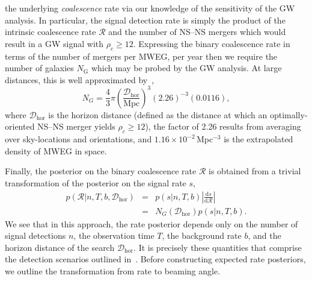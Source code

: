 \documentclass[twocolumn,nofootinbib]{revtex4-1}
\newcommand{\cbcrate}{{{\mathcal R}}}
\newcommand{\diff}{{\mathrm d}}
\newcommand{\dhor}{\ensuremath{{\mathcal D}_{\mathrm{hor}}}}
\newcommand{\mpc}{\mathrm{Mpc}}
\newcommand{\BNS}{\ac{NS}--\ac{NS}\xspace}
\begin{document}
the underlying \emph{coalescence} rate via our knowledge of the
sensitivity of the \ac{GW} analysis.  In particular, the signal
detection rate is simply the product of the intrinsic coalescence rate
$\cbcrate$ and the number of \BNS mergers which would result in a
\ac{GW} signal with $\rho_c\geq12$.  Expressing the binary coalescence
rate in terms of the number of mergers per \ac{MWEG}, per year then we
require the number of galaxies $N_{\mathrm{G}}$ which may be probed by
the \ac{GW} analysis.  At large distances, this is well approximated
by~\cite{rates_paper},
%
\begin{equation}
    N_G = \frac{4}{3} \pi \left( \frac{\dhor}{\mpc}
\right)^3 (2.26)^{-3} (0.0116),
\end{equation}
%
where $\dhor$ is the horizon distance (defined as the distance at which an
optimally-oriented \BNS merger yields $\rho_c\geq12$), the factor of 2.26
results from averaging over sky-locations and orientations, and
$1.16\times 10^{-2}$\,Mpc$^{-3}$ is the extrapolated density of \ac{MWEG} in
space.

Finally, the posterior on the binary coalescence rate $\cbcrate$ is obtained from a trivial transformation of the posterior on the signal rate $s$,
%
\begin{eqnarray}
    p(\cbcrate|n,T,b,\dhor) & = & p(s|n,T,b) \left|\frac{\diff s}{\diff \cbcrate}\right| \\
                                   & = & N_G(\dhor)p(s|n,T,b).
\end{eqnarray}
%
We see that in this approach, the rate posterior depends only on the
number of signal detections $n$, the observation time $T$, the
background rate $b$, and the horizon distance of the search $\dhor$.
It is precisely these quantities that comprise the detection scenarios
outlined in~\cite{Aasi:2013wya}.  Before constructing expected rate
posteriors, we outline the transformation from rate to beaming angle.
\end{document}
